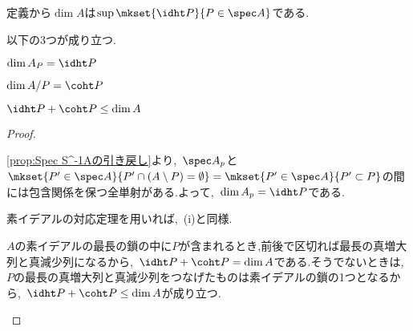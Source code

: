 	定義から$\dim A$は$\sup\mkset{\idht P}{P\in\spec A}$である.
	
	\begin{prop}\label{prop:htとcohtの定義}
		以下の3つが成り立つ.
		\begin{sakura}
			\item $\dim A_P=\idht P$
			\item $\dim A/P=\coht P$
			\item $\idht P+\coht P\leq\dim A$
		\end{sakura}
	\end{prop}

	\begin{proof}
		\begin{sakura}
			\item 
			\ref{prop:Spec S^-1Aの引き戻し}より,~$\spec A_p$と$\mkset{ P '\in\spec A}{ P '\cap (A\setminus P )=\emptyset}=\mkset{ P '\in\spec A}{ P '\subset P }$の間には包含関係を保つ全単射がある.よって,~$\dim A_p=\idht P $である.
			\item 
			素イデアルの対応定理を用いれば,~(i)と同様.
			\item 
			$A$の素イデアルの最長の鎖の中に$ P $が含まれるとき,前後で区切れば最長の真増大列と真減少列になるから,~$\idht P +\coht P =\dim A$である.そうでないときは,~$ P $の最長の真増大列と真減少列をつなげたものは素イデアルの鎖の1つとなるから,~$\idht P +\coht P \leq\dim A$が成り立つ.
		\end{sakura}
	\end{proof}
	

